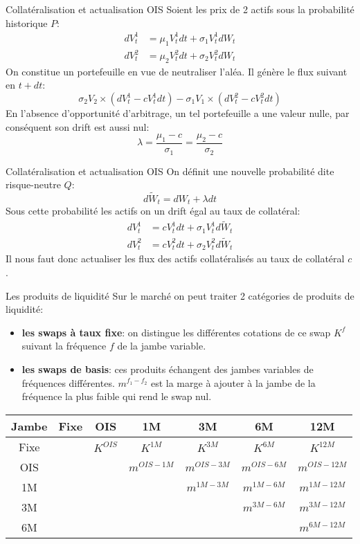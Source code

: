 \documentclass{beamer}
\begin{document}
\begin{frame}{Collatéralisation et actualisation OIS}
Soient les prix de 2 actifs sous la probabilité historique $P$:
\[
\begin{split}
dV^1_t&=\mu_1 V^1_t dt + \sigma_1 V^1_t dW_t\\
dV^2_t&=\mu_2 V^2_t dt + \sigma_2 V^2_t dW_t
\end{split}
\]
On constitue un portefeuille en vue de neutraliser l'aléa. Il génère le flux suivant en $t+dt$:
\[
\sigma_2 V_2 \times (dV^1_t - c V^1_t dt)-\sigma_1 V_1 \times (dV^2_t - c V^2_t dt)
\]
En l'absence d'opportunité d'arbitrage, un tel portefeuille a une valeur nulle, par conséquent son drift est aussi nul:
\[
\lambda=\frac{\mu_1-c}{\sigma_1}=\frac{\mu_2-c}{\sigma_2}
\]
\end{frame}

\begin{frame}{Collatéralisation et actualisation OIS}
On définit une nouvelle probabilité dite risque-neutre $Q$:\\
\[
d\widetilde{W}_t=dW_t+\lambda dt
\]
Sous cette probabilité les actifs on un drift égal au taux de collatéral:\\
\[
\begin{split}
dV^1_t&=c V^1_t dt + \sigma_1 V^1_t d\widetilde{W}_t\\
dV^2_t&=c V^2_t dt + \sigma_2 V^2_t d\widetilde{W}_t
\end{split}
\]
Il nous faut donc actualiser les flux des actifs collatéralisés au taux de collatéral $c$.

\end{frame}

\begin{frame}{Les produits de liquidité}
Sur le marché on peut traiter 2 catégories de produits de liquidité:
\begin{itemize}
\item \textbf{les swaps à taux fixe}: on distingue les différentes cotations de ce swap $K^f$ suivant la fréquence $f$ de la jambe variable.\\
\item \textbf{les swaps de basis}: ces produits échangent des jambes variables de fréquences différentes. $m^{f_1-f_2}$ est la marge à ajouter à la jambe de la fréquence la plus faible qui rend le swap nul.\\ 
\end{itemize}
\small
\begin{center}
\begin{tabular}{|c|c|c|c|c|c|c|}
\hline
Jambe&Fixe&OIS&1M&3M&6M&12M\\
\hline
Fixe&&$K^{OIS}$&$K^{1M}$&$K^{3M}$&$K^{6M}$&$K^{12M}$\\
\hline
OIS&&&$m^{OIS-1M}$&$m^{OIS-3M}$&$m^{OIS-6M}$&$m^{OIS-12M}$\\
1M&&&&$m^{1M-3M}$&$m^{1M-6M}$&$m^{1M-12M}$\\
3M&&&&&$m^{3M-6M}$&$m^{3M-12M}$\\
6M&&&&&&$m^{6M-12M}$\\
\hline
\end{tabular}
\end{center}
\end{frame}
\end{document}
